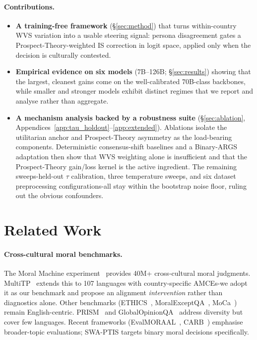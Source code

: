\documentclass{article}
\begin{document}
\paragraph{Contributions.}
\begin{itemize}
  \item \textbf{A training-free framework} (\S\ref{sec:method}) that turns
        within-country WVS variation into a usable steering signal: persona
        disagreement gates a Prospect-Theory-weighted IS correction in logit
        space, applied only when the decision is culturally contested.
  \item \textbf{Empirical evidence on six models} (7B--126B; \S\ref{sec:results})
        showing that the largest, cleanest gains come on the well-calibrated
        70B-class backbones, while smaller and stronger models exhibit distinct
        regimes that we report and analyse rather than aggregate.
  \item \textbf{A mechanism analysis backed by a robustness suite}
        (\S\ref{sec:ablation}, Appendices~\ref{app:tau_holdout}--\ref{app:extended}).
        Ablations isolate the utilitarian anchor and Prospect-Theory asymmetry
        as the load-bearing components. Deterministic consensus-shift
        baselines and a Binary-ARGS adaptation then show that WVS weighting
        alone is insufficient and that the Prospect-Theory gain/loss kernel is
        the active ingredient. The remaining sweeps-held-out $\tau$
        calibration, three temperature sweeps, and six dataset preprocessing
        configurations-all stay within the bootstrap noise floor, ruling out
        the obvious confounders.
\end{itemize}

\section{Related Work}
\label{sec:related}

\paragraph{Cross-cultural moral benchmarks.}
The Moral Machine experiment~\citep{awad2018moral} provides 40M+ cross-cultural moral
judgments. MultiTP~\citep{jin2025multitp} extends this to 107 languages with
country-specific AMCEs-we adopt it as our benchmark and propose an alignment
\emph{intervention} rather than diagnostics alone. Other benchmarks
(ETHICS~\citep{hendrycks2021aligning}, MoralExceptQA~\citep{jin2022exceptions},
MoCa~\citep{nie2023moca}) remain English-centric.
PRISM~\citep{kirk2024prism} and GlobalOpinionQA~\citep{durmus2023global} address
diversity but cover few languages. Recent frameworks
(EvalMORAAL~\citep{aakanksha2024evalmor}, CARB~\citep{myung2024carb}) emphasise
broader-topic evaluations; SWA-PTIS targets binary moral decisions specifically.
\end{document}
